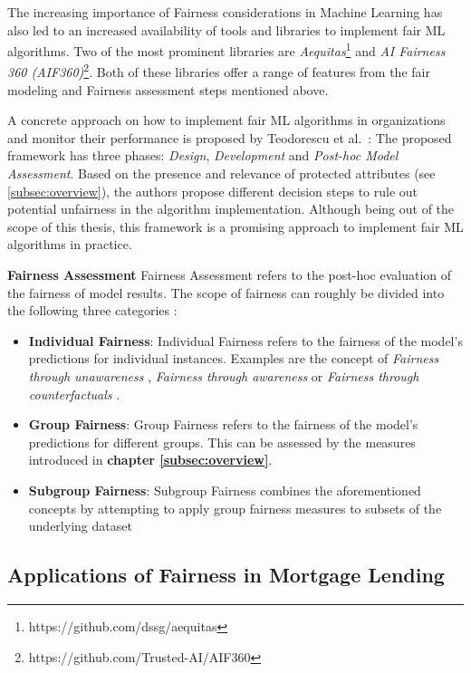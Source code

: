 The increasing importance of Fairness considerations in Machine Learning has also led to an increased availability of tools and libraries to implement fair ML algorithms.
Two of the most prominent libraries are \textit{Aequitas}\footnote{https://github.com/dssg/aequitas} and \textit{AI Fairness 360 (AIF360)}\footnote{https://github.com/Trusted-AI/AIF360}.
Both of these libraries offer a range of features from the fair modeling and Fairness assessment steps mentioned above.

A concrete approach on how to implement fair ML algorithms in organizations and monitor their performance is proposed by Teodorescu et al.\ \parencite{Teodorescu2020}:
The proposed framework has three phases: \textit{Design}, \textit{Development} and \textit{Post-hoc Model Assessment}. Based on the presence and relevance of protected attributes (see \autoref{subsec:overview}), the authors propose different decision steps to rule out potential unfairness in the algorithm implementation.
Although being out of the scope of this thesis, this framework is a promising approach to implement fair ML algorithms in practice.

\textbf{Fairness Assessment} \newline
Fairness Assessment refers to the post-hoc evaluation of the fairness of model results. The scope of fairness can roughly be divided into the following three categories \parencite{Mehrabi2021}:
\begin{itemize}
    \item \textbf{Individual Fairness}: Individual Fairness refers to the fairness of the model's predictions for individual instances. Examples are the concept of \textit{Fairness through unawareness} \parencite{Kusner2017},  \textit{Fairness through awareness} \parencite{Dwork2012} or \textit{Fairness through counterfactuals} \parencite{Kusner2017}.
    \item \textbf{Group Fairness}: Group Fairness refers to the fairness of the model's predictions for different groups. This can be assessed by the measures introduced in \textbf{chapter \ref{subsec:overview}}.
    \item \textbf{Subgroup Fairness}: Subgroup Fairness combines the aforementioned concepts by attempting to apply group fairness measures to subsets of the underlying dataset \parencite{Kearns2019}
\end{itemize}

\subsection{Applications of Fairness in Mortgage Lending}\label{subsec:mortgage_lending_fairness}

